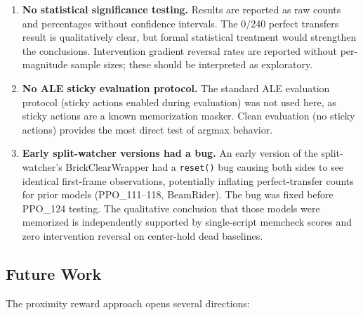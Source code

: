 \documentclass[11pt]{article}
\begin{document}
\begin{enumerate}
    \item \textbf{No statistical significance testing.} Results are reported as
    raw counts and percentages without confidence intervals. The 0/240 perfect
    transfers result is qualitatively clear, but formal statistical treatment
    would strengthen the conclusions. Intervention gradient reversal rates
    are reported without per-magnitude sample sizes; these should be
    interpreted as exploratory.

    \item \textbf{No ALE sticky evaluation protocol.} The standard ALE
    evaluation protocol (sticky actions enabled during evaluation) was not
    used here, as sticky actions are a known memorization masker. Clean
    evaluation (no sticky actions) provides the most direct test of argmax
    behavior.

    \item \textbf{Early split-watcher versions had a bug.} An
    early version of the split-watcher's BrickClearWrapper had a
    \texttt{reset()} bug causing both sides to see identical first-frame
    observations, potentially inflating perfect-transfer counts for prior
    models (PPO\_111--118, BeamRider). The bug was fixed before PPO\_124
    testing. The qualitative conclusion that those models were memorized is
    independently supported by single-script memcheck scores and zero
    intervention reversal on center-hold dead baselines.
\end{enumerate}

\subsection{Future Work}

The proximity reward approach opens several directions:
\end{document}
